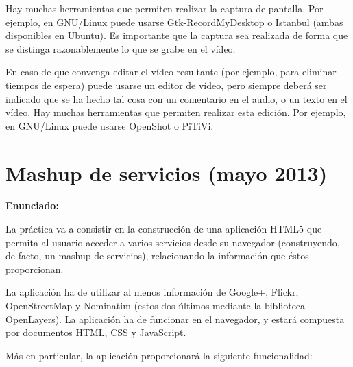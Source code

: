 Hay muchas herramientas que permiten realizar la captura de pantalla. Por ejemplo, en GNU/Linux puede usarse Gtk-RecordMyDesktop o Istanbul (ambas disponibles en Ubuntu). Es importante que la captura sea realizada de forma que se distinga razonablemente lo que se grabe en el vídeo.

En caso de que convenga editar el vídeo resultante (por ejemplo, para eliminar tiempos de espera) puede usarse un editor de vídeo, pero siempre deberá ser indicado que se ha hecho tal cosa con un comentario en el audio, o un texto en el vídeo. Hay muchas herramientas que permiten realizar esta edición. Por ejemplo, en GNU/Linux puede usarse OpenShot o PiTiVi.


\section{Mashup de servicios (mayo 2013)}
\label{sec:final-13-mayo}

\textbf{Enunciado:}

La práctica va a consistir en la construcción de una aplicación HTML5 que permita al usuario acceder a varios servicios desde su navegador (construyendo, de facto, un mashup de servicios), relacionando la información que éstos proporcionan.

La aplicación ha de utilizar al menos información de Google+, Flickr, OpenStreetMap y Nominatim (estos dos últimos mediante la biblioteca OpenLayers). La aplicación ha de funcionar en el navegador, y estará compuesta por documentos HTML, CSS y JavaScript.

Más en particular, la aplicación proporcionará la siguiente funcionalidad:

